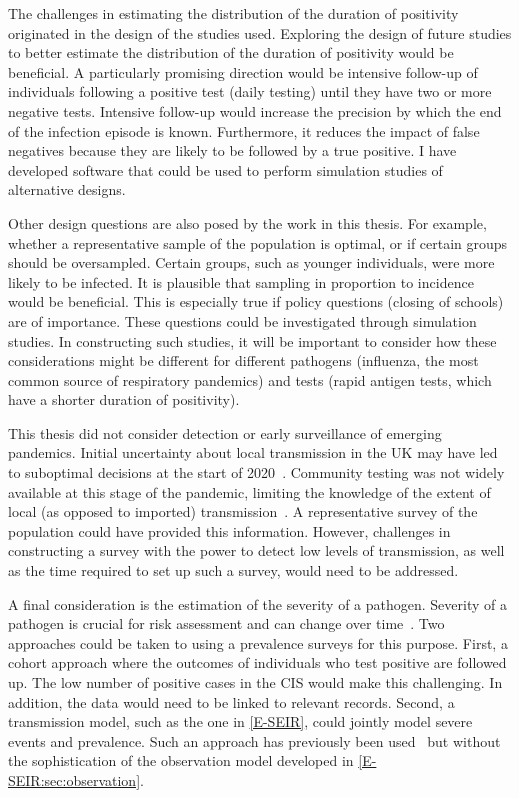 \documentclass[thesis.tex]{subfiles}
\begin{document}
The challenges in estimating the distribution of the duration of positivity originated in the design of the studies used.
Exploring the design of future studies to better estimate the distribution of the duration of positivity would be beneficial.
A particularly promising direction would be intensive follow-up of individuals following a positive test (\eg daily testing) until they have two or more negative tests.
Intensive follow-up would increase the precision by which the end of the infection episode is known.
Furthermore, it reduces the impact of false negatives because they are likely to be followed by a true positive.
I have developed software that could be used to perform simulation studies of alternative designs.

Other design questions are also posed by the work in this thesis.
For example, whether a representative sample of the population is optimal, or if certain groups should be oversampled.
Certain groups, such as younger individuals, were more likely to be infected.
It is plausible that sampling in proportion to incidence would be beneficial.
This is especially true if policy questions (\eg closing of schools) are of importance.
These questions could be investigated through simulation studies.
In constructing such studies, it will be important to consider how these considerations might be different for different pathogens (\eg influenza, the most common source of respiratory pandemics) and tests (\eg rapid antigen tests, which have a shorter duration of positivity).

This thesis did not consider detection or early surveillance of emerging pandemics.
Initial uncertainty about local transmission in the UK may have led to suboptimal decisions at the start of 2020~\autocite{pellisChallenges}.
Community testing was not widely available at this stage of the pandemic, limiting the knowledge of the extent of local (as opposed to imported) transmission~\autocite{whittyTechReportCOVID}.
A representative survey of the population could have provided this information.
However, challenges in constructing a survey with the power to detect low levels of transmission, as well as the time required to set up such a survey, would need to be addressed.

A final consideration is the estimation of the severity of a pathogen.
Severity of a pathogen is crucial for risk assessment and can change over time~\autocite[e.g.][]{kirwanSeverityTrends}.
Two approaches could be taken to using a prevalence surveys for this purpose.
First, a cohort approach where the outcomes of individuals who test positive are followed up.
The low number of positive cases in the CIS would make this challenging.
In addition, the data would need to be linked to relevant records.
Second, a transmission model, such as the one in \cref{E-SEIR}, could jointly model severe events and prevalence.
Such an approach has previously been used~\autocite{daviesAssociation,ironsEstimating,knockKey,nicholsonImproving,pooleyEstimation,birrellRTM2} but without the sophistication of the observation model developed in \cref{E-SEIR:sec:observation}.

\ifSubfilesClassLoaded{
  \listoftodos
}{}
\end{document}
